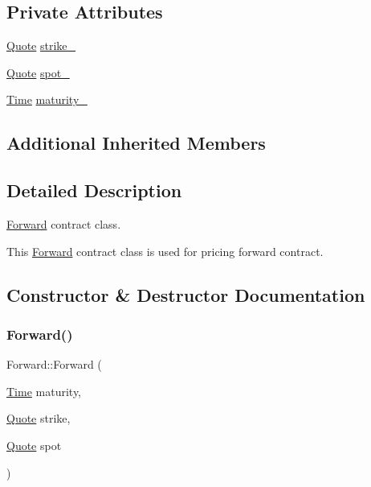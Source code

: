 \subsection*{Private Attributes}
\begin{DoxyCompactItemize}
\item 
\hyperlink{_name_def_8h_a642a6c5fd87319d922637de0e0bb0305}{Quote} \hyperlink{class_forward_a17c32d0a673c13fd92288b1720a43b76}{strike\+\_\+}
\item 
\hyperlink{_name_def_8h_a642a6c5fd87319d922637de0e0bb0305}{Quote} \hyperlink{class_forward_a362d0396ceda462e504f77120339f8b0}{spot\+\_\+}
\item 
\hyperlink{_name_def_8h_ac2d3e0ba793497bcca555c7c2cf64ff3}{Time} \hyperlink{class_forward_ad599104a13c33fbf31e9214af904e9aa}{maturity\+\_\+}
\end{DoxyCompactItemize}
\subsection*{Additional Inherited Members}


\subsection{Detailed Description}
\hyperlink{class_forward}{Forward} contract class. 

This \hyperlink{class_forward}{Forward} contract class is used for pricing forward contract. 

\subsection{Constructor \& Destructor Documentation}
\hypertarget{class_forward_a7ec14e1a089290cae0e70c4cddd353b5}{}\label{class_forward_a7ec14e1a089290cae0e70c4cddd353b5} 
\subsubsection{\texorpdfstring{Forward()}{Forward()}}
{\footnotesize\ttfamily Forward\+::\+Forward (\begin{DoxyParamCaption}\item[{\hyperlink{_name_def_8h_ac2d3e0ba793497bcca555c7c2cf64ff3}{Time}}]{maturity,  }\item[{\hyperlink{_name_def_8h_a642a6c5fd87319d922637de0e0bb0305}{Quote}}]{strike,  }\item[{\hyperlink{_name_def_8h_a642a6c5fd87319d922637de0e0bb0305}{Quote}}]{spot }\end{DoxyParamCaption})}




